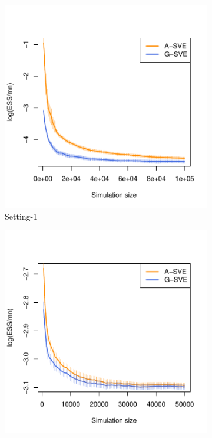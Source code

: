 \documentclass[11pt]{article}
\theoremstyle{remark}
\begin{document}
\begin{figure}[h]
    \centering
    
    \begin{subfigure}[h]{.4\textwidth}
      \centering
      \includegraphics[width = \textwidth]{plots/boom-ess_1_3_8_m5.pdf}
      \caption{Setting-1}
      \label{subfig:boom-ess1}
    \end{subfigure} \hspace{1cm}
    \begin{subfigure}[h]{.4\textwidth}
      \centering
      \includegraphics[width = \textwidth]{plots/boom-ess_1_10_7_m5.pdf}

\end{subfigure}
\end{figure}
\end{document}
